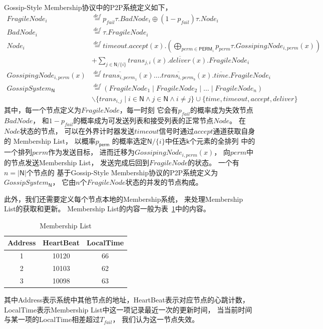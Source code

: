 Gossip-Style Membership协议中的P2P系统定义如下，
\begin{align*}
    FragileNode_i&\stackrel{def}{=}p_{fail}\tau.BadNode_i\oplus (1-p_{fail})\tau.Node_i\\
    BadNode_i&\stackrel{def}{=}\tau.FragileNode_i\\
    Node_i&\stackrel{def}{=}timeout.accept(x).(\bigoplus_{perm\in \mathsf{PERM}_i} p_{perm}\tau.GossipingNode_{i,perm}(x))\\
     &+\sum_{j\in \mathsf{N}/\{i\}}trans_{j,i}(x).\overline{deliver}(x).FragileNode_i\\
    GossipingNode_{i,perm}(x)&\stackrel{def}{=}\overline{trans_{i,perm_{1}}}(x).\dots \overline{trans_{i,perm_{b}}}(x).\overline{time}.FragileNode_i\\
    GossipSystem_\mathsf{N}&\stackrel{def}{=}(FragileNode_1\mid FragileNode_2\mid \dots \mid FragileNode_n)\\
    &\backslash \{trans_{i,j}\mid i\in \mathsf{N} \wedge j\in \mathsf{N} \wedge i\neq j\}\cup \{time, timeout, accept, deliver\}
 \end{align*}
 其中，每一个节点定义为$FragileNode$，每一时刻
 它会有$p_{fail}$的概率成为失效节点$BadNode$，
 和$1-p_{fail}$的概率成为可发送列表和接受列表的正常节点$Node$。
 在$Node$状态的节点，
 可以在外界计时器发送$timeout$信号时通过$accept$通道获取自身的
 Membership List，
 以概率$p_{\mathsf{perm}}$
 的概率选定$\mathsf{N}/\{i\}$中任选$\mathsf{k}$个元素的全排列
 中的一个排列$perm$作为发送目标，
 进而迁移为$GossipingNode_{i,perm}(x)$，
 向$perm$中的节点发送Membership List，
 发送完成后回到$FragileNode$的状态。
 一个有$n=|\mathsf{N}|$个节点的
 基于Gossip-Style Membership协议的P2P系统定义为
 $GossipSystem_{\mathsf{N}}$，
 它由$n$个$FragileNode$状态的并发的节点构成。

 此外，我们还需要定义每个节点本地的Membership系统，
 来处理Membership List的获取和更新。
 Membership List的内容一般为表~\ref{tab:membership_list}中的内容。
\begin{table}[!hpt]
    \caption[Membership List]{Membership List}
    \label{tab:membership_list}
    \centering
    \begin{tabular}{@{}ccc@{}} \toprule
      Address & HeartBeat & LocalTime \\ \midrule
      1 & 10120 & 66\\
      2 & 10103 & 62\\
      3 & 10098 & 63\\ \bottomrule
    \end{tabular}
  \end{table}
其中Address表示系统中其他节点的地址，HeartBeat表示对应节点的心跳计数，
LocalTime表示Membership List中这一项记录最近一次的更新时间，
当当前时间与某一项的LocalTime相差超过$T_{fail}$，
我们认为这一节点失效。

